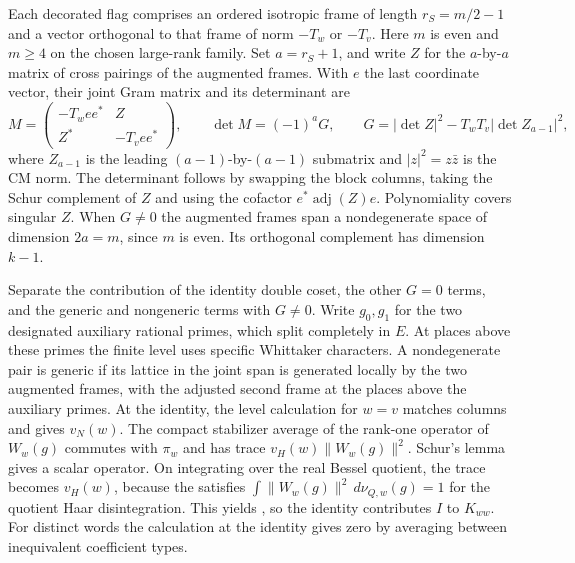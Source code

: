 \leavevmode{}%
Each decorated flag comprises an ordered isotropic frame of length
\(r_S=m/2-1\) and a vector orthogonal to that frame of norm
\(-T_w\) or \(-T_v\). Here \(m\) is even and \(m\ge4\) on the
chosen large-rank family. Set \(a=r_S+1\), and write
\(Z\) for the \(a\)-by-\(a\) matrix of cross pairings of the augmented
frames. With \(e\) the last coordinate vector, their joint Gram matrix
and its determinant are
\[
  M=\begin{pmatrix}-T_w ee^*&Z\\ Z^*&-T_v ee^*\end{pmatrix},
  \qquad
  \det M=(-1)^a G,\qquad
  G=|\det Z|^2-T_wT_v|\det Z_{a-1}|^2 ,
\]
where \(Z_{a-1}\) is the leading \((a-1)\)-by-\((a-1)\) submatrix
and \(|z|^2=z\bar z\) is the CM norm. The determinant follows by swapping
the block columns, taking the Schur complement of \(Z\) and using the
cofactor \(e^*\operatorname{adj}(Z)e\). Polynomiality covers singular
\(Z\). When \(G\ne0\) the augmented
frames span a nondegenerate space of dimension \(2a=m\), since \(m\)
is even. Its orthogonal complement has dimension \(k-1\).

Separate the contribution of the identity double coset, the other
\(G=0\) terms, and the generic and nongeneric terms with \(G\ne0\).
Write \(g_0,g_1\) for the two designated auxiliary rational primes,
which split completely in \(E\). At places above these primes the
finite level uses specific Whittaker characters. A nondegenerate pair
is generic if its lattice in the joint span is generated locally by
the two augmented frames, with the adjusted second frame at the
places above the auxiliary primes. At the identity, the level
calculation for \(w=v\) matches columns and gives \(v_N(w)\). The
compact stabilizer average of the rank-one operator of \(W_w(g)\)
commutes with \(\pi_w\) and has trace \(v_H(w)\|W_w(g)\|^2\).
Schur's lemma gives a scalar operator. On integrating over the real
Bessel quotient, the trace becomes \(v_H(w)\), because the
satisfies \(\int\|W_w(g)\|^2\,d\nu_{Q,w}(g)=1\) for the quotient
Haar disintegration. This yields
,
so the identity contributes \(I\) to
\(K_{ww}\). For distinct words the calculation at the identity gives
zero by averaging between inequivalent coefficient types.

